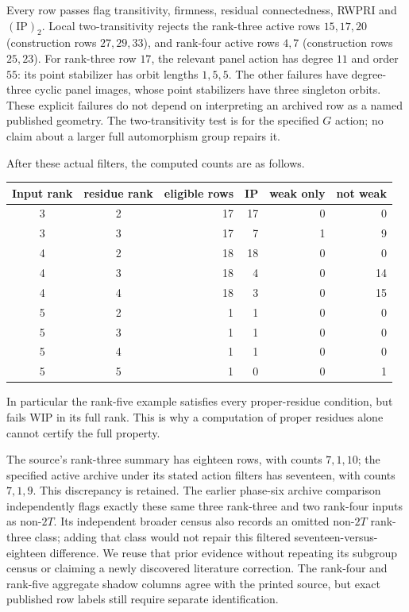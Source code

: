 \documentclass[11pt]{article}
\begin{document}
Every row passes flag transitivity, firmness, residual connectedness,
RWPRI and $(\mathrm{IP})_2$. Local two-transitivity rejects the
rank-three active rows $15,17,20$ (construction rows $27,29,33$), and
rank-four active rows $4,7$ (construction rows $25,23$).
For rank-three row $17$, the relevant panel action has degree $11$
and order $55$: its point stabilizer has orbit lengths $1,5,5$.
The other failures have degree-three cyclic panel images, whose point
stabilizers have three singleton orbits. These explicit failures do not
depend on interpreting an archived row as a named published geometry.
The two-transitivity test is for the specified $G$ action; no claim
about a larger full automorphism group repairs it.

After these actual filters, the computed counts are as follows.
\begin{center}
\begin{tabular}{ccrrrr}\toprule
Input rank & residue rank & eligible rows & IP & weak only & not weak\\\midrule
3&2&17&17&0&0\\3&3&17&7&1&9\\
4&2&18&18&0&0\\4&3&18&4&0&14\\4&4&18&3&0&15\\
5&2&1&1&0&0\\5&3&1&1&0&0\\5&4&1&1&0&0\\5&5&1&0&0&1\\\bottomrule
\end{tabular}
\end{center}
In particular the rank-five example satisfies every proper-residue
condition, but fails WIP in its full rank. This is why a computation of
proper residues alone cannot certify the full property.

The source's rank-three summary has eighteen rows, with counts
$7,1,10$; the specified active archive under its stated action filters
has seventeen, with counts $7,1,9$. This discrepancy is retained.
The earlier phase-six archive comparison independently flags exactly
these same three rank-three and two rank-four inputs as non-$2T$.
Its independent broader census also records an omitted non-$2T$
rank-three class; adding that class would not repair this filtered
seventeen-versus-eighteen difference. We reuse that prior evidence
without repeating its subgroup census or claiming a newly discovered
literature correction. The rank-four and rank-five aggregate shadow
columns agree with the printed source, but exact published row labels
still require separate identification.
\end{document}
